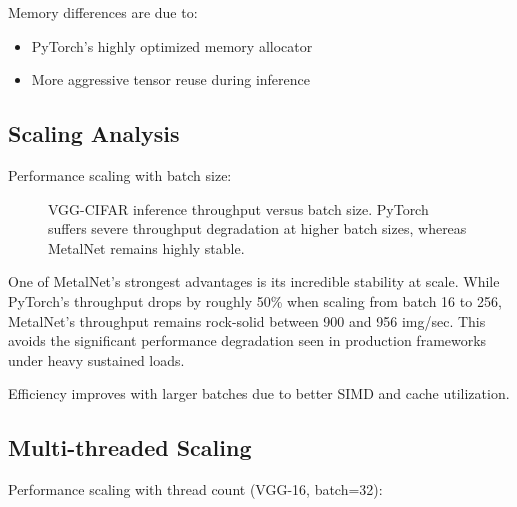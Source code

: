 \documentclass[12pt,oneside,a4paper]{report}
\begin{document}
Memory differences are due to:
\begin{itemize}
    \item PyTorch's highly optimized memory allocator
    \item More aggressive tensor reuse during inference
\end{itemize}

\subsection{Scaling Analysis}

Performance scaling with batch size:

\begin{figure}[H]
\centering
{}
\caption[VGG-CIFAR inference throughput versus batch size]{VGG-CIFAR inference throughput versus batch size. PyTorch suffers severe throughput degradation at higher batch sizes, whereas MetalNet remains highly stable.}
\label{fig:batchscaling}
\end{figure}

One of MetalNet's strongest advantages is its incredible stability at scale. While PyTorch's throughput drops by roughly 50\% when scaling from batch 16 to 256, MetalNet's throughput remains rock-solid between 900 and 956 img/sec. This avoids the significant performance degradation seen in production frameworks under heavy sustained loads.

Efficiency improves with larger batches due to better SIMD and cache utilization.

\subsection{Multi-threaded Scaling}

Performance scaling with thread count (VGG-16, batch=32):
\end{document}
